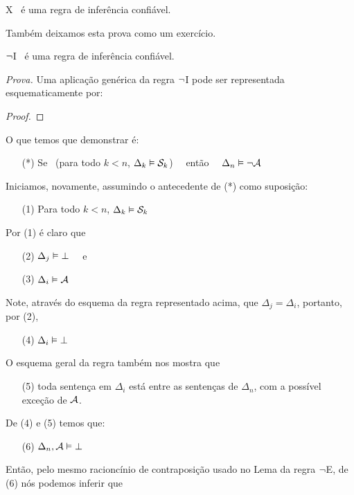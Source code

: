 \begin{factoidboxe}
	X \ é uma regra de inferência confiável.
\end{factoidboxe}

Também deixamos esta prova como um exercício.

\begin{factoidboxe}
	$\neg$I \ é uma regra de inferência confiável.
\end{factoidboxe}
\noindent\emph{Prova.}
	Uma aplicação genérica da regra $\neg$I pode ser representada esquematicamente por:
\begin{proof}
   \open
   \close
\end{proof}\noindent
O que temos que demonstrar é:
\begin{itemize}
	\item[(*)]  Se  \ ({para todo}  $k<n$, $\Delta_k \vDash \mathcal{S}_k$) \ \ então \ \ $\Delta_n \vDash \neg\mathcal{A}$
\end{itemize}
Iniciamos, novamente, assumindo o antecedente de (*) como suposição:
\begin{itemize}
	\item[(1)] Para todo  $k<n$, $\Delta_k \vDash \mathcal{S}_k$
\end{itemize}
Por (1) é claro que
\begin{itemize}
	\item[(2)] $\Delta_j \vDash \bot$ \ \ e
\end{itemize}
\begin{itemize}
	\item[(3)] $\Delta_i \vDash \mathcal{A}$
\end{itemize}
Note, através do esquema da regra representado acima, que $\Delta_j=\Delta_i$, portanto, por (2),
\begin{itemize}
	\item[(4)] $\Delta_i \vDash \bot$
\end{itemize}
O esquema geral da regra também nos mostra que
\begin{itemize}
 	\item[(5)] toda sentença em $\Delta_i$ está entre as sentenças de $\Delta_n$, com a possível exceção de $\mathcal{A}$.
\end{itemize}
De (4) e (5) temos que:
\begin{itemize}
	\item[(6)] $\Delta_n, \mathcal{A} \vDash \bot$
\end{itemize}
Então, pelo mesmo racioncínio de contraposição usado no Lema da regra $\neg$E, de (6) nós podemos inferir que
